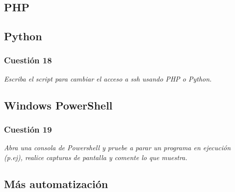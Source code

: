 \subsection{PHP}
\subsection{Python}
\subsubsection{Cuestión 18}
\textit{Escriba el script para cambiar el acceso a ssh usando PHP o Python.}


\subsection{Windows PowerShell}
\subsubsection{Cuestión 19}
\textit{Abra una consola de Powershell y pruebe a parar un programa en ejecución (p.ej), realice capturas de pantalla y comente lo que muestra.}

\subsection{Más automatización}


\newpage




